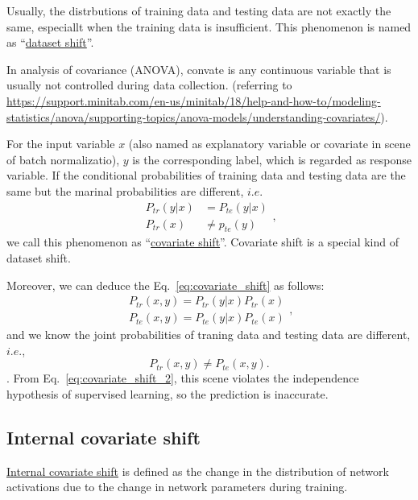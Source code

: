 \documentclass[10pt,onecolumn]{book}
\begin{document}
Usually, the distrbutions of training data and testing data are not exactly the same, especiallt when the training data is insufficient. This phenomenon is named as ``\uline{dataset shift}''. 

In analysis of covariance (ANOVA), convate is any continuous variable that is usually not controlled during data collection. (referring to \url{https://support.minitab.com/en-us/minitab/18/help-and-how-to/modeling-statistics/anova/supporting-topics/anova-models/understanding-covariates/}). 

For the input variable $x$ (also named as explanatory variable or covariate in scene of batch normalizatio), $y$ is the corresponding label, which is regarded as response variable. If the conditional probabilities of training data and testing data are the same but the marinal probabilities are different, $i.e.$
\begin{equation}\label{eq:covariate_shift}
\begin{split}
P_{tr}(y|x) & = P_{te}(y|x) \\
P_{tr}(x) & \ne p_{te}(y)
\end{split},
\end{equation}
we call this phenomenon as ``\uline{covariate shift}''. Covariate shift is a special kind of dataset shift. 

Moreover, we can deduce the Eq.~\ref{eq:covariate_shift} as follows:
\begin{equation}
\begin{split}
P_{tr}(x, y) = P_{tr}(y|x)P_{tr}(x) \\
P_{te}(x, y) = P_{te}(y|x)P_{te}(x)
\end{split},
\end{equation}
and we know the joint probabilities of traning data and testing data are different, $i. e.$, 
\begin{equation}\label{eq:covariate_shift_2}
P_{tr}(x, y) \ne P_{te}(x, y).
\end{equation}.
From Eq.~\ref{eq:covariate_shift_2}, this scene violates the independence hypothesis of supervised learning, so the prediction is inaccurate.


\subsection{Internal covariate shift}
\uline{Internal covariate shift} is defined as the change in the distribution of network activations due to the change in network parameters during training. 
\end{document}
